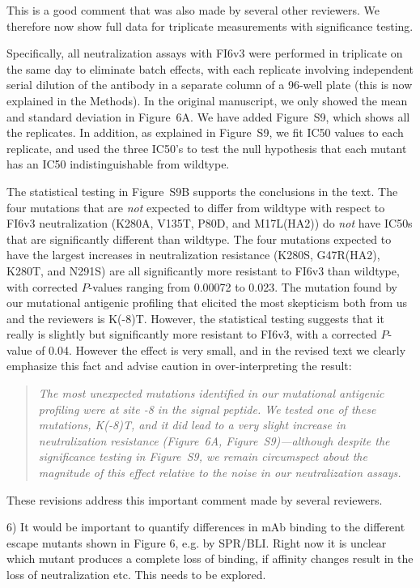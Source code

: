 \documentclass[11pt, oneside]{article}   	%
\begin{document}
{\color{black}
This is a good comment that was also made by several other reviewers.
We therefore now show full data for triplicate measurements with significance testing.

Specifically, all neutralization assays with FI6v3 were performed in triplicate on the same day to eliminate batch effects, with each replicate involving independent serial dilution of the antibody in a separate column of a 96-well plate (this is now explained in the Methods).
In the original manuscript, we only showed the mean and standard deviation in Figure~6A.
We have added Figure~S9, which shows all the replicates.
In addition, as explained in Figure~S9, we fit IC50 values to each replicate, and used the three IC50's to test the null hypothesis that each mutant has an IC50 indistinguishable from wildtype.

The statistical testing in Figure~S9B supports the conclusions in the text. 
The four mutations that are \emph{not} expected to differ from wildtype with respect to FI6v3 neutralization (K280A, V135T, P80D, and M17L(HA2)) do \emph{not} have IC50s that are significantly different than wildtype.
The four mutations expected to have the largest increases in neutralization resistance (K280S, G47R(HA2), K280T, and N291S) are all significantly more resistant to FI6v3 than wildtype, with corrected $P$-values ranging from 0.00072 to 0.023.
The mutation found by our mutational antigenic profiling that elicited the most skepticism both from us and the reviewers is K(-8)T.
However, the statistical testing suggests that it really is slightly but significantly more resistant to FI6v3, with a corrected $P$-value of 0.04. 
However the effect is very small, and in the revised text we clearly emphasize this fact and advise caution in over-interpreting the result:

\begin{quote}
\textsl{The most unexpected mutations identified in our mutational antigenic profiling were at site -8 in the signal peptide.
We tested one of these mutations, K(-8)T, and it did lead to a very slight increase in neutralization resistance (Figure~6A, Figure~S9)---although despite the significance testing in Figure~S9, we remain circumspect about the magnitude of this effect relative to the noise in our neutralization assays.
}
\end{quote}

These revisions address this important comment made by several reviewers.
}

6) It would be important to quantify differences in mAb binding to the different escape mutants shown in Figure 6, e.g. by SPR/BLI. Right now it is unclear which mutant produces a complete loss of binding, if affinity changes result in the loss of neutralization etc. This needs to be explored.
\end{document}
